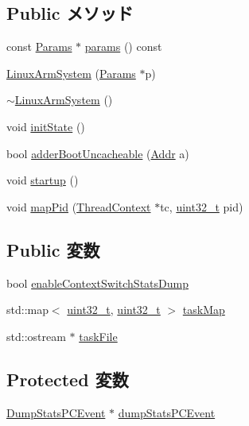 \subsection*{Public メソッド}
\begin{DoxyCompactItemize}
\item 
const \hyperlink{classLinuxArmSystem_ae0ebf28024a7bb607cc65e59c8faa9d5}{Params} $\ast$ \hyperlink{classLinuxArmSystem_acd3c3feb78ae7a8f88fe0f110a718dff}{params} () const 
\item 
\hyperlink{classLinuxArmSystem_a8bd9f34635b50e93feedccfe117e75bb}{LinuxArmSystem} (\hyperlink{classLinuxArmSystem_ae0ebf28024a7bb607cc65e59c8faa9d5}{Params} $\ast$p)
\item 
\hyperlink{classLinuxArmSystem_a3e10e01606ed67da6f24837440bfb69f}{$\sim$LinuxArmSystem} ()
\item 
void \hyperlink{classLinuxArmSystem_a3c34ea9b29f410748d4435a667484924}{initState} ()
\item 
bool \hyperlink{classLinuxArmSystem_ac081da131af9bc2b37f4c4d7d99eaff1}{adderBootUncacheable} (\hyperlink{classm5_1_1params_1_1Addr}{Addr} a)
\item 
void \hyperlink{classLinuxArmSystem_aecc7d8debf54990ffeaaed5bac7d7d81}{startup} ()
\item 
void \hyperlink{classLinuxArmSystem_a7126cba24850188b3f0e08beec5e95d8}{mapPid} (\hyperlink{classThreadContext}{ThreadContext} $\ast$tc, \hyperlink{Type_8hh_a435d1572bf3f880d55459d9805097f62}{uint32\_\-t} pid)
\end{DoxyCompactItemize}
\subsection*{Public 変数}
\begin{DoxyCompactItemize}
\item 
bool \hyperlink{classLinuxArmSystem_a4f36b860c5380f4fc20e37e283fd8a1b}{enableContextSwitchStatsDump}
\item 
std::map$<$ \hyperlink{Type_8hh_a435d1572bf3f880d55459d9805097f62}{uint32\_\-t}, \hyperlink{Type_8hh_a435d1572bf3f880d55459d9805097f62}{uint32\_\-t} $>$ \hyperlink{classLinuxArmSystem_af0a9621b833015091de5c531ad29b078}{taskMap}
\item 
std::ostream $\ast$ \hyperlink{classLinuxArmSystem_aade5b03480aa42a0aab017e273e847a1}{taskFile}
\end{DoxyCompactItemize}
\subsection*{Protected 変数}
\begin{DoxyCompactItemize}
\item 
\hyperlink{classDumpStatsPCEvent}{DumpStatsPCEvent} $\ast$ \hyperlink{classLinuxArmSystem_a20f10ec8abaa110783e089fa10fc4da3}{dumpStatsPCEvent}
\end{DoxyCompactItemize}
